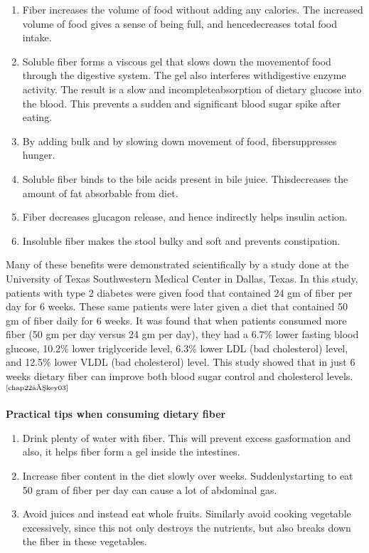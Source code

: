 \vspace{-\topsep}
\begin{enumerate}[•]
\itemsep=0pt
\item Fiber increases the volume of food without adding any calories. The increased volume of food gives a sense of being full, and hence\break decreases total food intake.
\item Soluble fiber forms a viscous gel that slows down the movement\break of food through the digestive system. The gel also interferes with\break digestive enzyme activity. The result is a slow and incomplete\break absorption of dietary glucose into the blood. This prevents a sudden and significant blood sugar spike after eating.
\item By adding bulk and by slowing down movement of food, fiber\break suppresses hunger.
\item Soluble fiber binds to the bile acids present in bile juice. This\break decreases the amount of fat absorbable from diet.
\item Fiber decreases glucagon release, and hence indirectly helps insulin action.
\item Insoluble fiber makes the stool bulky and soft and prevents consti\-pation.
\end{enumerate}
\vspace{-\topsep}

Many of these benefits were demonstrated scientifically by a study done at the University of Texas Southwestern Medical Center in Dallas, Texas. In this study, patients with type 2 diabetes were given food that contained 24 gm of fiber per day for 6 weeks. These same patients were later given a diet that contained 50 gm of fiber daily for 6 weeks. It was found that when patients consumed more fiber (50 gm per day versus 24 gm per day), they had a 6.7\% lower fasting blood glucose, 10.2\% lower triglyceride level, 6.3\% lower LDL (bad cholesterol) level, and 12.5\% lower VLDL (bad cholesterol) level. This study showed that in just 6 weeks dietary fiber can improve both blood sugar control and cholesterol levels.$^{\text{\cite{chap22–key03}}}$

\noindent\textbf{Practical tips when consuming dietary fiber}

\vspace{-\topsep}
\begin{enumerate}[•]
\itemsep=0pt
\item Drink plenty of water with fiber. This will prevent excess gas\break formation and also, it helps fiber form a gel inside the intestines.
\item Increase fiber content in the diet slowly over weeks. Suddenly\break starting to eat 50 gram of fiber per day can cause a lot of abdominal gas.
\item Avoid juices and instead eat whole fruits. Similarly avoid cooking vegetable excessively, since this not only destroys the nutrients, but also breaks down the fiber in these vegetables.
\end{enumerate}
\vspace{-\topsep}

